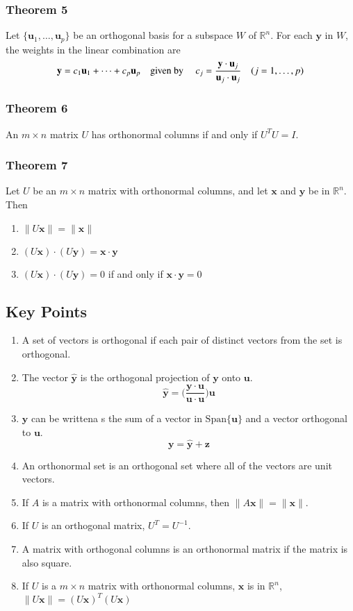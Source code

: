 \documentclass{article}
\begin{document}
\subsubsection*{Theorem 5}
Let $\{\mathbf{u}_1, \ldots, \mathbf{u}_p\}$ be an orthogonal basis for a subspace $W$ of
$\mathbb{R}^n$. For each $\mathbf{y}$ in $W$, the weights in the linear combination are
\[\mathbf{y}=c_1\mathbf{u}_1 + \cdots + c_p\mathbf{u}_p\text{\quad given by \quad} c_j=
\frac{\mathbf{y}\cdot\mathbf{u}_j}{\mathbf{u}_j\cdot \mathbf{u}_j}\quad (j=1, \ldots, p)\]

\subsubsection*{Theorem 6}
An $m\times n$ matrix $U$ has orthonormal columns if and only if $U^T U=I$.

\subsubsection*{Theorem 7}
Let $U$ be an $m\times n$ matrix with orthonormal columns, and let $\mathbf{x}$ and $\mathbf{y}$ be
in $\mathbb{R}^n$. Then
\begin{enumerate}
    \item $\|U\mathbf{x}\|=\|\mathbf{x}\|$
    \item $(U\mathbf{x})\cdot(U\mathbf{y})=\mathbf{x}\cdot\mathbf{y}$
    \item $(U\mathbf{x})\cdot(U\mathbf{y})=0$ if and only if $\mathbf{x}\cdot\mathbf{y}=0$
\end{enumerate}

\subsection*{Key Points}
\begin{enumerate}
    \item A set of vectors is orthogonal if each pair of distinct vectors from the set is
    orthogonal.
    \item The vector $\mathbf{\hat{y}}$ is the orthogonal projection of $\mathbf{y}$ onto
    $\mathbf{u}$.
    \[\mathbf{\hat{y}}=\Bigg(\frac{\mathbf{y\cdot u}}{\mathbf{u\cdot u}}\Bigg)\mathbf{u}\]
    \item $\mathbf{y}$ can be writtena s the sum of a vector in $\text{Span}\{\mathbf{u}\}$ and a
    vector orthogonal to $\mathbf{u}$.
    \[\mathbf{y}=\mathbf{\hat{y}}+\mathbf{z}\]
    \item An orthonormal set is an orthogonal set where all of the vectors are unit vectors.
    \item If $A$ is a matrix with orthonormal columns, then $\|A\mathbf{x}\|=\|\mathbf{x}\|$.
    \item If $U$ is an orthogonal matrix, $U^T=U^{-1}$.
    \item A matrix with orthogonal columns is an orthonormal matrix if the matrix is also square.
    \item If $U$ is a $m\times n$ matrix with orthonormal columns, $\mathbf{x}$ is in $\mathbb{R}^n$, $\|U\mathbf{x}\|={(U\mathbf{x})}^T(U\mathbf{x})$
\end{enumerate}
\end{document}
